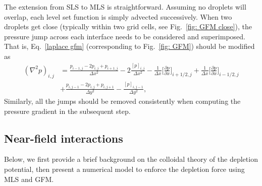 The extension from SLS to MLS is straightforward. Assuming no droplets will overlap, each level set function is simply advected successively. When two droplets get close (typically within two grid cells, see Fig.\ \ref{fig: GFM close}), the pressure jump across each interface needs to be considered and superimposed. That is, Eq.\ \eqref{laplace gfm} (corresponding to Fig.\ \ref{fig: GFM}) should be modified as
\begin{equation}
  \begin{aligned}
    (\nabla^2 p)_{i,j} & =\frac{p_{i-1,j} -2p_{i,j} +p_{i+1,j}}{\Delta x^2} 
                         -2\frac{[p]_{i,j}}{\Delta x^2} 
                         -\frac{1}{\Delta x} \bigg[\frac{\partial p}{\partial x} \bigg]_{i+1/2,j}
                         +\frac{1}{\Delta x} \bigg[\frac{\partial p}{\partial x} \bigg]_{i-1/2,j} \\
                       & +\frac{p_{i,j-1} -2p_{i,j} +p_{i,j+1}}{\Delta y^2}
                         -\frac{[p]_{i,j-1}}{\Delta y^2},
  \end{aligned}
  \label{laplace gfm mls}
\end{equation}
Similarly, all the jumps should be removed consistently when computing the pressure gradient in the subsequent step. 


\subsection{Near-field interactions}
\label{subsec: pot}


 Below, we first provide a brief background on the colloidal theory of the depletion potential, then present a numerical model to enforce the depletion force using MLS and GFM.


